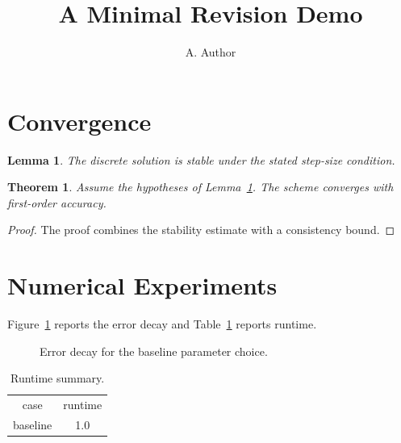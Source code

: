 \documentclass{article}
\newtheorem{theorem}{Theorem}
\newtheorem{lemma}{Lemma}
\begin{document}
\title{A Minimal Revision Demo}
\author{A. Author}
\maketitle

\section{Convergence}

\begin{lemma}\label{lem:stability}
The discrete solution is stable under the stated step-size condition.
\end{lemma}

\begin{theorem}\label{thm:conv}
Assume the hypotheses of Lemma~\ref{lem:stability}. The scheme converges with first-order accuracy.
\end{theorem}

\begin{proof}
The proof combines the stability estimate with a consistency bound.
\end{proof}

\section{Numerical Experiments}

Figure~\ref{fig:error} reports the error decay and Table~\ref{tab:runtime} reports runtime.

\begin{figure}
\centering
{}
\caption{Error decay for the baseline parameter choice.}
\label{fig:error}
\end{figure}

\begin{table}
\centering
\begin{tabular}{cc}
case & runtime \\
baseline & 1.0 \\
\end{tabular}
\caption{Runtime summary.}
\label{tab:runtime}
\end{table}


\end{document}
